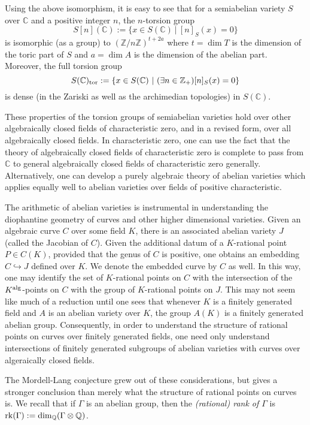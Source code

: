 \documentclass{amsart}
\newcommand{\CC}{{\mathbb C}}
\newcommand{\QQ}{{\mathbb Q}}
\newcommand{\ZZ}{{\mathbb Z}}
\newcommand{\alg}{{\rm alg}}
\theoremstyle{definition}
\theoremstyle{remark}
\begin{document}
Using the above isomorphism, it is easy to see that for a semiabelian variety $S$ over
$\CC$ and a positive integer $n$, the $n$-torsion group 
$$S[n](\CC) := \{ x \in S(\CC) \ \vert \ [n]_S(x) = 0 \}$$ 
is isomorphic (as a group) to $(\ZZ/n \ZZ)^{t + 2a}$ where $t = \dim T$
is the dimension of the toric part of $S$ and $a = \dim A$ is the dimension of the 
abelian part.  Moreover, the full torsion group 
$$S(\CC)_{\rm tor} := \{ x \in S(\CC) \ \vert \ (\exists n \in \ZZ_+) [n]_S(x) = 0 \}$$
is dense (in the Zariski as well as the archimedian topologies) in $S(\CC)$.

These properties of the torsion groups of semiabelian varieties hold over other algebraically 
closed fields of characteristic zero, and in a revised form, over all algebraically
 closed fields.  In  characteristic zero, one can use the fact that the theory 
of algebraically closed fields of  characteristic zero is complete to pass from
 $\CC$ to general algebraically closed fields of characteristic zero generally. 
Alternatively, one can develop a purely algebraic theory of abelian varieties which
applies equally well to abelian varieties over fields of positive characteristic.

The arithmetic of abelian varieties is instrumental in understanding 
the diophantine geometry of curves and other higher dimensional varieties. 
Given an algebraic curve $C$ over some field $K$, there is an associated 
abelian variety $J$ (called the Jacobian of $C$).  Given the additional 
datum of a $K$-rational point $P \in C(K)$, provided that the genus of $C$ is 
positive, one obtains an embedding 
$C \hookrightarrow J$ defined over $K$.  We denote the embedded curve by 
$C$ as well.   In this way, one may identify the set
of $K$-rational points on $C$ with the intersection of the $K^\alg$-points on $C$
with the group of $K$-rational points on $J$.  This may not seem like much 
of a reduction until one sees that whenever $K$ is a finitely generated field and 
$A$ is an abelian variety over $K$, the group $A(K)$ is a finitely generated abelian
group.  Consequently, in order to understand the structure of rational points 
on curves over finitely generated fields, one need only understand intersections
of finitely generated subgroups of abelian varieties with curves over algeraically
closed fields.

The Mordell-Lang conjecture grew out of these considerations, but gives a stronger 
conclusion than merely what the structure of rational points on curves is. 
We recall that if $\Gamma$ is an abelian group, then the \emph{(rational) rank of $\Gamma$}
is ${\rm rk} (\Gamma) := \dim_\QQ (\Gamma \otimes \QQ)$.  
\end{document}
